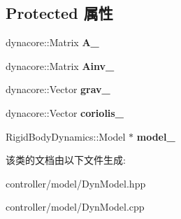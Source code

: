 \subsection*{Protected 属性}
\begin{DoxyCompactItemize}
\item 
\mbox{\label{classquadruped_1_1DynModel_a56f317b42dd8ca721c8723f573018e80}} 
dynacore\+::\+Matrix {\bfseries A\+\_\+}
\item 
\mbox{\label{classquadruped_1_1DynModel_a0d961539f3e26444b0064d9d286b0dd8}} 
dynacore\+::\+Matrix {\bfseries Ainv\+\_\+}
\item 
\mbox{\label{classquadruped_1_1DynModel_a4cc208318b72f683f7dd5097d4a3c8da}} 
dynacore\+::\+Vector {\bfseries grav\+\_\+}
\item 
\mbox{\label{classquadruped_1_1DynModel_a8e200c399836e1db3e3d8b0b8ba738da}} 
dynacore\+::\+Vector {\bfseries coriolis\+\_\+}
\item 
\mbox{\label{classquadruped_1_1DynModel_ab4eac018b2b0385acbd30351c0594d29}} 
Rigid\+Body\+Dynamics\+::\+Model $\ast$ {\bfseries model\+\_\+}
\end{DoxyCompactItemize}


该类的文档由以下文件生成\+:\begin{DoxyCompactItemize}
\item 
controller/model/Dyn\+Model.\+hpp\item 
controller/model/Dyn\+Model.\+cpp\end{DoxyCompactItemize}
